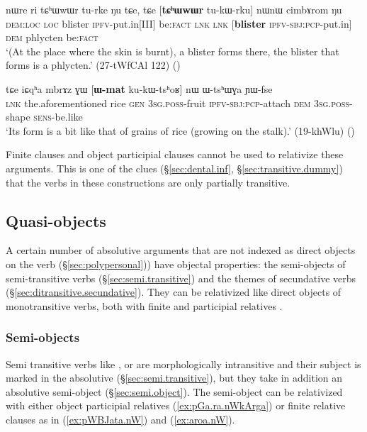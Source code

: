 \begin{exe}
\ex \label{ex:tCHWwWr.turke}
\gll nɯre ri tɕʰɯwɯr tu-rke ŋu tɕe, tɕe [\textbf{tɕʰɯwɯr} tu-kɯ-rku] nɯnɯ cimbɤrom ŋu \\
\textsc{dem}:\textsc{loc} \textsc{loc} blister \textsc{ipfv}-put.in[III] be:\textsc{fact} \textsc{lnk} \textsc{lnk} [\textbf{blister} \textsc{ipfv}-\textsc{sbj}:\textsc{pcp}-put.in] \textsc{dem} phlycten be:\textsc{fact} \\
\glt `(At the place where the skin is burnt), a blister forms there, the blister that forms is a phlycten.' (27-tWfCAl 122)
()
\end{exe} 

\begin{exe}
\ex \label{ex:Wmat.kukWtshoR}
\gll tɕe iɕqʰa mbrɤz ɣɯ [\textbf{ɯ-mat} ku-kɯ-tsʰoʁ] nɯ ɯ-tsʰɯɣa ɲɯ-fse \\
\textsc{lnk} the.aforementioned rice \textsc{gen} \textsc{3sg}.\textsc{poss}-fruit \textsc{ipfv}-\textsc{sbj}:\textsc{pcp}-attach \textsc{dem} \textsc{3sg}.\textsc{poss}-shape \textsc{sens}-be.like \\
\glt `Its form is a bit like that of grains of rice (growing on the stalk).' (19-khWlu)
()
\end{exe}

Finite clauses and object participial clauses cannot be used to relativize these arguments. This is one of the clues (§\ref{sec:dental.inf}, §\ref{sec:transitive.dummy}) that the verbs in these constructions are only partially transitive.

\subsection{Quasi-objects} \label{sec:semi.object.relativization}
A certain number of absolutive arguments that are not indexed as direct objects on the verb (§\ref{sec:polypersonal})) have objectal properties: the semi-objects of
semi-transitive verbs (§\ref{sec:semi.transitive}) and the themes of secundative verbs (§\ref{sec:ditransitive.secundative}). They can be
relativized like direct objects of monotransitive verbs, both with finite and participial
relatives \citep{jacques16relatives}.


  \subsubsection{Semi-objects}  \label{sec:semi.tr.relativization}
 Semi transitive verbs like ,  or  are morphologically intransitive and their subject is marked in the absolutive (§\ref{sec:semi.transitive}), but they take in addition an absolutive semi-object (§\ref{sec:semi.object}). The semi-object can be relativized with either object participial relatives (\ref{ex:pGa.ra.nWkArga}) or finite relative clauses as in (\ref{ex:pWBJata.nW}) and (\ref{ex:aroa.nW}).
 
